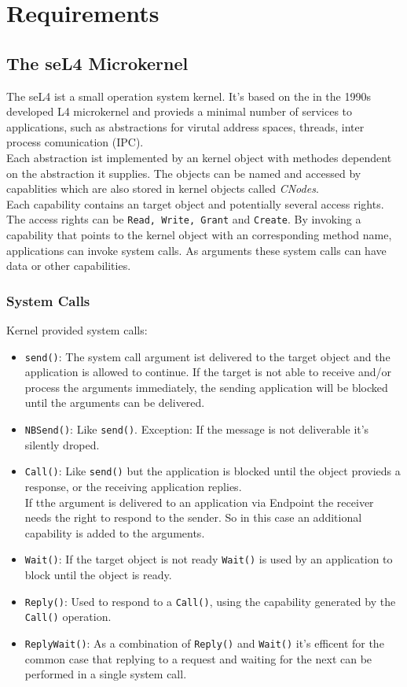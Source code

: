 \documentclass[pdftex,11pt,a4paper]{article}
\begin{document}
	
	\clearpage
	
	\section{Requirements}
	\subsection{The seL4 Microkernel}
	The seL4 \cite{Manual} ist a small operation system kernel. It's based on the in the 1990s developed L4 microkernel and provieds a minimal number of services to applications, such as abstractions for virutal address spaces, threads, inter process comunication (IPC). \\
	Each abstraction ist implemented by an kernel object with methodes dependent on the abstraction it supplies. The objects can be named and accessed by capablities which are also stored in kernel objects called \textit{CNodes}. \\
	Each capability contains an target object and potentially several access rights. The access rights can be \texttt{Read, Write, Grant} and \texttt{Create}. By invoking a capability that points to the kernel object  with an corresponding method name, applications can invoke system calls. As arguments these system calls can have data or other capabilities. 
	\subsubsection{System Calls}
	Kernel provided system calls: \\
	\begin{itemize}
	\item \texttt{send()}: The system call argument ist delivered to the target object and the application is allowed to continue. If the target is not able to receive and/or process the arguments immediately, the sending application will be blocked until the arguments can be delivered.
	\item \texttt{NBSend()}: Like \texttt{send()}. Exception: If the message is not deliverable it's silently droped.
	\item \texttt{Call()}: Like \texttt{send()} but the application is blocked until the object provieds a response, or the receiving application replies. \\
	If tthe argument is delivered to an application via Endpoint the receiver needs the right to respond to the sender. So in this case an additional capability is added to the arguments. 
	\item \texttt{Wait()}: If the target object is not ready \texttt{Wait()} is used by an application to block until the object is ready. 
	\item \texttt{Reply()}: Used to respond to a \texttt{Call()}, using the capability generated by the \texttt{Call()} operation.
	\item \texttt{ReplyWait()}: As a combination of \texttt{Reply()} and \texttt{Wait()} it's efficent for the common case that replying to a request and waiting for the next can be performed in a single system call. 
	\end{itemize}
	\newpage
\end{document}
